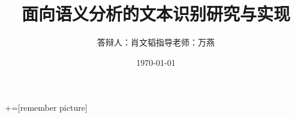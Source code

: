 \documentclass[12pt]{beamer}
\author{答辩人：肖文韬\quad 指导老师：万燕}
\title{面向语义分析的文本识别研究与实现}
\institute{东华大学}
\date{\today}
\begin{document}

+=[remember picture]





%
\end{document}
